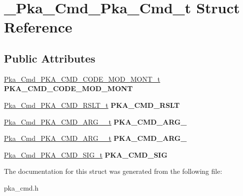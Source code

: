 \hypertarget{struct__Pka__Cmd__Pka__Cmd__t}{\section{\-\_\-\-Pka\-\_\-\-Cmd\-\_\-\-Pka\-\_\-\-Cmd\-\_\-t Struct Reference}
\label{struct__Pka__Cmd__Pka__Cmd__t}
}
\subsection*{Public Attributes}
\begin{DoxyCompactItemize}
\item 
\hypertarget{struct__Pka__Cmd__Pka__Cmd__t_aaa94cf786361fd6a531e5c664d0cdbca}{\hyperlink{union__Pka__Cmd__PKA__CMD__CODE__MOD__MONT__t}{Pka\-\_\-\-Cmd\-\_\-\-P\-K\-A\-\_\-\-C\-M\-D\-\_\-\-C\-O\-D\-E\-\_\-\-M\-O\-D\-\_\-\-M\-O\-N\-T\-\_\-t} {\bfseries P\-K\-A\-\_\-\-C\-M\-D\-\_\-\-C\-O\-D\-E\-\_\-\-M\-O\-D\-\_\-\-M\-O\-N\-T}}\label{struct__Pka__Cmd__Pka__Cmd__t_aaa94cf786361fd6a531e5c664d0cdbca}

\item 
\hypertarget{struct__Pka__Cmd__Pka__Cmd__t_a729a0e8d0754ad0075ea416b907a5dbe}{\hyperlink{union__Pka__Cmd__PKA__CMD__RSLT__t}{Pka\-\_\-\-Cmd\-\_\-\-P\-K\-A\-\_\-\-C\-M\-D\-\_\-\-R\-S\-L\-T\-\_\-t} {\bfseries P\-K\-A\-\_\-\-C\-M\-D\-\_\-\-R\-S\-L\-T}}\label{struct__Pka__Cmd__Pka__Cmd__t_a729a0e8d0754ad0075ea416b907a5dbe}

\item 
\hypertarget{struct__Pka__Cmd__Pka__Cmd__t_a78e34a01008af658004f0404d9ca9e4e}{\hyperlink{union__Pka__Cmd__PKA__CMD__ARG__1__t}{Pka\-\_\-\-Cmd\-\_\-\-P\-K\-A\-\_\-\-C\-M\-D\-\_\-\-A\-R\-G\-\_\-\_\-t} {\bfseries P\-K\-A\-\_\-\-C\-M\-D\-\_\-\-A\-R\-G\-\_}}\label{struct__Pka__Cmd__Pka__Cmd__t_a78e34a01008af658004f0404d9ca9e4e}

\item 
\hypertarget{struct__Pka__Cmd__Pka__Cmd__t_a8b4c59790d297d001113789be6625c46}{\hyperlink{union__Pka__Cmd__PKA__CMD__ARG__2__t}{Pka\-\_\-\-Cmd\-\_\-\-P\-K\-A\-\_\-\-C\-M\-D\-\_\-\-A\-R\-G\-\_\-\_\-t} {\bfseries P\-K\-A\-\_\-\-C\-M\-D\-\_\-\-A\-R\-G\-\_}}\label{struct__Pka__Cmd__Pka__Cmd__t_a8b4c59790d297d001113789be6625c46}

\item 
\hypertarget{struct__Pka__Cmd__Pka__Cmd__t_a53d2d03ab1194110e9bf2731048b4033}{\hyperlink{union__Pka__Cmd__PKA__CMD__SIG__t}{Pka\-\_\-\-Cmd\-\_\-\-P\-K\-A\-\_\-\-C\-M\-D\-\_\-\-S\-I\-G\-\_\-t} {\bfseries P\-K\-A\-\_\-\-C\-M\-D\-\_\-\-S\-I\-G}}\label{struct__Pka__Cmd__Pka__Cmd__t_a53d2d03ab1194110e9bf2731048b4033}

\end{DoxyCompactItemize}


The documentation for this struct was generated from the following file\-:\begin{DoxyCompactItemize}
\item 
pka\-\_\-cmd.\-h\end{DoxyCompactItemize}
